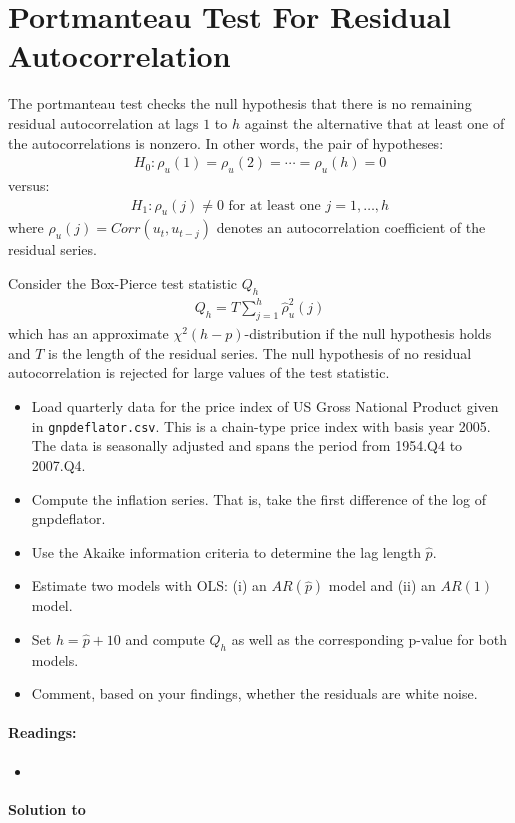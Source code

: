 \section[Portmanteau Test For Residual Autocorrelation]{Portmanteau Test For Residual Autocorrelation\label{ex:PortmanteauTestResidualAutocorrelation}}
The portmanteau test checks the null hypothesis
  that there is no remaining residual autocorrelation at lags \(1\) to \(h\)
  against the alternative that at least one of the autocorrelations is nonzero.
In other words, the pair of hypotheses:
\begin{align*}
H_0:\rho_u(1)=\rho_u(2)=\cdots =\rho_u(h) = 0
\end{align*}
versus:
\begin{align*}
H_1: \rho_u(j) \neq 0 \text{~for at least one~} j=1,\ldots ,h
\end{align*}
where \(\rho_u(j) = Corr(u_t, u_{t-j})\) denotes an autocorrelation coefficient of the residual series.

Consider the Box-Pierce test statistic \(Q_h\)
\begin{align*}
Q_h = T \sum_{j=1}^h \hat{\rho}^2_u(j)
\end{align*}
which has an approximate \(\chi^2(h-p)\)-distribution if the null hypothesis holds
  and \(T\) is the length of the residual series.
The null hypothesis of no residual autocorrelation is rejected for large values of the test statistic.

\begin{itemize}

\item
Load quarterly data for the price index of US Gross National Product given in \texttt{gnpdeflator.csv}.
This is a chain-type price index with basis year 2005.
The data is seasonally adjusted and spans the period from 1954.Q4 to 2007.Q4.

\item
Compute the inflation series.
That is, take the first difference of the log of gnpdeflator.

\item
Use the Akaike information criteria to determine the lag length \(\hat{p}\).

\item
Estimate two models with {OLS}:
  (i) an \(AR(\hat{p})\) model and
  (ii) an \(AR(1)\) model.

\item
Set \(h=\hat{p}+10\) and compute \(Q_h\) as well as the corresponding p-value for both models.

\item
Comment, based on your findings, whether the residuals are white noise.
\end{itemize}

\paragraph{Readings:}
\begin{itemize}
\item \textcite{Lutkepohl_2004_UnivariateTimeSeries}
\end{itemize}

\begin{solution}\textbf{Solution to }
\ifDisplaySolutions%

\fi
\newpage
\end{solution}